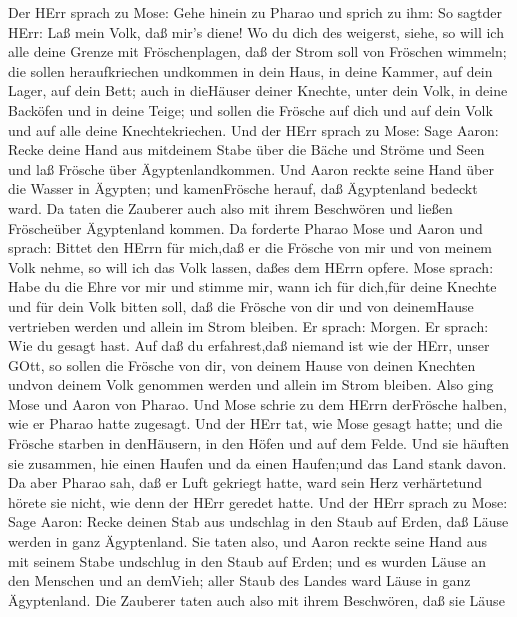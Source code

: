  Der HErr sprach zu Mose: Gehe hinein zu Pharao und sprich
zu ihm: So sagtder HErr: Laß mein Volk, daß mir's diene!  Wo
du dich des weigerst, siehe, so will ich alle deine Grenze mit
Fröschenplagen,  daß der Strom soll von Fröschen wimmeln;
die sollen heraufkriechen undkommen in dein Haus, in deine Kammer, auf
dein Lager, auf dein Bett; auch in dieHäuser deiner Knechte, unter dein
Volk, in deine Backöfen und in deine Teige;  und sollen die
Frösche auf dich und auf dein Volk und auf alle deine Knechtekriechen.
 Und der HErr sprach zu Mose: Sage Aaron: Recke deine Hand
aus mitdeinem Stabe über die Bäche und Ströme und Seen und laß Frösche
über Ägyptenlandkommen.  Und Aaron reckte seine Hand über
die Wasser in Ägypten; und kamenFrösche herauf, daß Ägyptenland bedeckt
ward.  Da taten die Zauberer auch also mit ihrem Beschwören
und ließen Fröscheüber Ägyptenland kommen.  Da forderte
Pharao Mose und Aaron und sprach: Bittet den HErrn für mich,daß er die
Frösche von mir und von meinem Volk nehme, so will ich das Volk lassen,
daßes dem HErrn opfere.  Mose sprach: Habe du die Ehre vor
mir und stimme mir, wann ich für dich,für deine Knechte und für dein
Volk bitten soll, daß die Frösche von dir und von deinemHause vertrieben
werden und allein im Strom bleiben.  Er sprach: Morgen. Er
sprach: Wie du gesagt hast. Auf daß du erfahrest,daß niemand ist wie der
HErr, unser GOtt,  so sollen die Frösche von dir, von
deinem Hause von deinen Knechten undvon deinem Volk genommen werden und
allein im Strom bleiben.  Also ging Mose und Aaron von
Pharao. Und Mose schrie zu dem HErrn derFrösche halben, wie er Pharao
hatte zugesagt.  Und der HErr tat, wie Mose gesagt hatte;
und die Frösche starben in denHäusern, in den Höfen und auf dem Felde.
 Und sie häuften sie zusammen, hie einen Haufen und da
einen Haufen;und das Land stank davon.  Da aber Pharao sah,
daß er Luft gekriegt hatte, ward sein Herz verhärtetund hörete sie
nicht, wie denn der HErr geredet hatte.  Und der HErr
sprach zu Mose: Sage Aaron: Recke deinen Stab aus undschlag in den Staub
auf Erden, daß Läuse werden in ganz Ägyptenland.  Sie taten
also, und Aaron reckte seine Hand aus mit seinem Stabe undschlug in den
Staub auf Erden; und es wurden Läuse an den Menschen und an demVieh;
aller Staub des Landes ward Läuse in ganz Ägyptenland.  Die
Zauberer taten auch also mit ihrem Beschwören, daß sie Läuse
